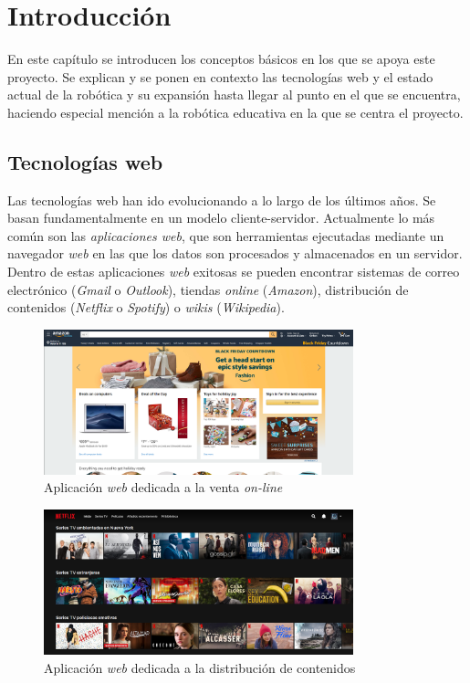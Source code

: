 
\chapter{Introducción}
\label{chap:intro} 
En este capítulo se introducen los conceptos básicos en los que se apoya este proyecto. Se explican y se ponen en contexto las tecnologías web y el estado actual de la robótica y su expansión hasta llegar al punto en el que se encuentra, haciendo especial mención a la robótica educativa en la que se centra el proyecto.
   
\section{Tecnologías web}
\label{sec:web}
Las tecnologías web han ido evolucionando a lo largo de los últimos años. Se basan fundamentalmente en un modelo cliente-servidor. Actualmente lo más común son las \textit{aplicaciones web}, que son herramientas ejecutadas mediante un navegador \textit{web} en las que los datos son procesados y almacenados en un servidor. Dentro de estas aplicaciones \textit{web} exitosas se pueden encontrar sistemas de correo electrónico (\textit{Gmail}  o \textit{Outlook}), tiendas \textit{online} (\textit{Amazon}), distribución de contenidos (\textit{Netflix} o \textit{Spotify}) o \textit{wikis} (\textit{Wikipedia}).


    \begin{figure}[H]
    \centering
    \includegraphics[width=0.8\textwidth]{img/amazon.png}
    \caption{Aplicación \textit{web} dedicada a la venta \textit{on-line}} \label{fig:amazon}
    \end{figure}
    
    \begin{figure}[H]
    \centering
    \includegraphics[width=0.8\textwidth]{img/netflix.png}
    \caption{Aplicación \textit{web} dedicada a la distribución de contenidos} \label{fig:netflix}
    \end{figure}
